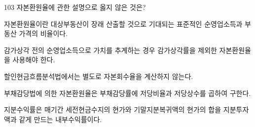 \begin{question}{103}
자본환원율에 관한 설명으로 옳지 않은 것은?
\begin{choices}
  \item 자본환원율이란 대상부동산이 장래 산출할 것으로 기대되는 표준적인 순영업소득과 부동산 가격의 비율이다.
  \item 감가상각 전의 순영업소득으로 가치를 추계하는 경우 감가상각률을 제외한 자본환원율을 사용해야 한다.
  \item 할인현금흐름분석법에서는 별도로 자본회수율을 계산하지 않는다.
  \item 부채감당법에 의한 자본환원율은 부채감당률에 저당비율과 저당상수를 곱하여 구한다.
  \item 지분수익률은 매기간 세전현금수지의 현가와 기말지분복귀액의 현가의 합을 지분투자액과 같게 만드는 내부수익률이다.
\end{choices}
\end{question}
